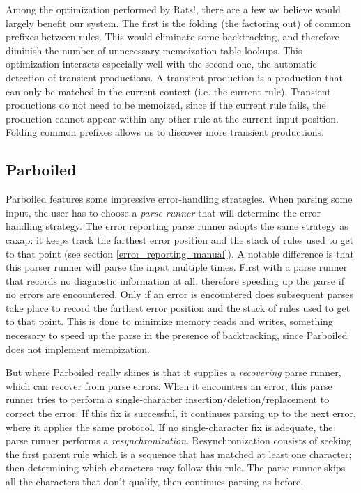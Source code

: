 Among the optimization performed by Rats!, there are a few we believe would
largely benefit our system. The first is the folding (the factoring out) of
common prefixes between rules. This would eliminate some backtracking, and
therefore diminish the number of unnecessary memoization table lookups. This
optimization interacts especially well with the second one, the automatic
detection of transient productions. A transient production is a production that
can only be matched in the current context (i.e. the current rule). Transient
productions do not need to be memoized, since if the current rule fails, the
production cannot appear within any other rule at the current input
position. Folding common prefixes allows us to discover more transient
productions.

\subsection{Parboiled}

Parboiled \cite{parboiled} features some impressive error-handling
strategies. When parsing some input, the user has to choose a \emph{parse
  runner} that will determine the error-handling strategy. The error reporting
parse runner adopts the same strategy as caxap: it keeps track the farthest
error position and the stack of rules used to get to that point (see section
\ref{error_reporting_manual}). A notable difference is that this parser runner
will parse the input multiple times. First with a parse runner that records no
diagnostic information at all, therefore speeding up the parse if no errors are
encountered. Only if an error is encountered does subsequent parses take place
to record the farthest error position and the stack of rules used to get to that
point. This is done to minimize memory reads and writes, something necessary to
speed up the parse in the presence of backtracking, since Parboiled does not
implement memoization.

But where Parboiled really shines is that it supplies a \emph{recovering} parse
runner, which can recover from parse errors. When it encounters an error, this
parse runner tries to perform a single-character insertion/deletion/replacement
to correct the error. If this fix is successful, it continues parsing up to the
next error, where it applies the same protocol. If no single-character fix is
adequate, the parse runner performs a
\emph{resynchronization}. Resynchronization consists of seeking the first parent
rule which is a sequence that has matched at least one character; then
determining which characters may follow this rule. The parse runner skips all
the characters that don't qualify, then continues parsing as before.

